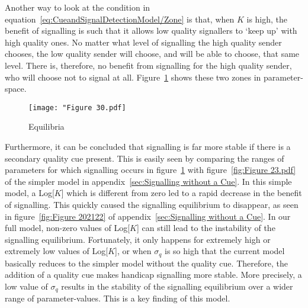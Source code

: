 \documentclass[a4paper,12pt]{article}
\numberwithin{equation}{section}
\begin{document}
Another way to look at the condition in equation~\ref{eq:CueandSignalDetectionModel/Zone} is that, when $K$ is high, the benefit of signalling is such that it allows low quality signallers to `keep up' with high quality ones. No matter what level of signalling the high quality sender chooses, the low quality sender will choose, and will be able to choose, that same level. There is, therefore, no benefit from signalling for the high quality sender, who will choose not to signal at all. Figure~\ref{fig:Figure 30.pdf} shows these two zones in parameter-space.

\begin{figure}[h]
\begin{center}
\leavevmode
\texttt{[image: "Figure 30.pdf]}
\caption{Equilibria}
\label{fig:Figure 30.pdf}
\end{center}
\end{figure}

Furthermore, it can be concluded that signalling is far more stable if there is a secondary quality cue present. This is easily seen by comparing the ranges of parameters for which signalling occurs in figure~\ref{fig:Figure 30.pdf} with figure~\ref{fig:Figure 23.pdf} of the simpler model in appendix~\ref{sec:Signalling without a Cue}. In this simple model, a Log[$K$] which is different from zero led to a rapid decrease in the benefit of signalling. This quickly caused the signalling equilibrium to disappear, as seen in figure~\ref{fig:Figure 202122} of appendix~\ref{sec:Signalling without a Cue}. In our full model, non-zero values of Log[$K$] can still lead to the instability of the signalling equilibrium. Fortunately, it only happens for extremely high or extremely low values of Log[$K$], or when $\sigma_{q}$ is so high that the current model basically reduces to the simpler model without the quality cue. Therefore, the addition of a quality cue makes handicap signalling more stable. More precisely, a low value of $\sigma_{q}$ results in the stability of the signalling equilibrium over a wider range of parameter-values. This is a key finding of this model.
\end{document}
